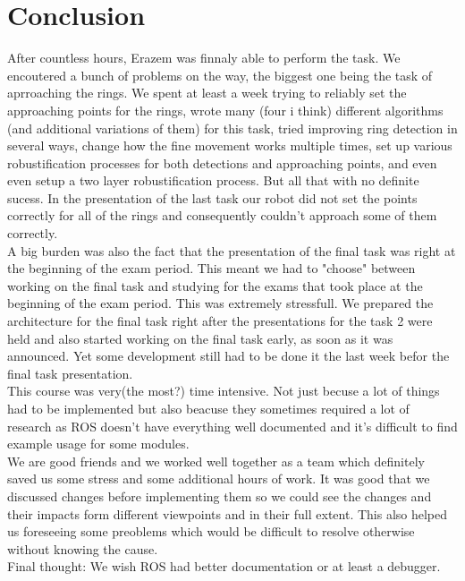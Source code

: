 \documentclass[12pt,a4paper]{article}
\begin{document}
	\section{Conclusion}
	After countless hours, Erazem was finnaly able to perform the task. We encoutered a bunch of problems on the way, the biggest one being the task of aprroaching the rings. We spent at least a week trying to reliably set the approaching points for the rings, wrote many (four i think) different algorithms (and additional variations of them) for this task, tried improving ring detection in several ways, change how the fine movement works multiple times, set up various robustification processes for both detections and approaching points, and even even setup a two layer robustification process. But all that with no definite sucess. In the presentation of the last task our robot did not set the points correctly for all of the rings and consequently couldn't approach some of them correctly. \\

	A big burden was also the fact that the presentation of the final task was right at the beginning of the exam period. This meant we had to "choose" between working on the final task and studying for the exams that took place at the beginning of the exam period. This was extremely stressfull. We prepared the architecture for the final task right after the presentations for the task 2 were held and also started working on the final task early, as soon as it was announced. Yet some development still had to be done it the last week befor the final task presentation. \\
	
	This course was very(the most?) time intensive. Not just becuse a lot of things had to be implemented but also beacuse they sometimes required a lot of research as ROS doesn't have everything well documented and it's difficult to find example usage for some modules. \\

	We are good friends and we worked well together as a team which definitely saved us some stress and some additional hours of work. It was good that we discussed changes before implementing them so we could see the changes and their impacts form different viewpoints and in their full extent. This also helped us foreseeing some preoblems which would be difficult to resolve otherwise without knowing the cause. \\

	Final thought: We wish ROS had better documentation or at least a debugger. \\
\end{document}
